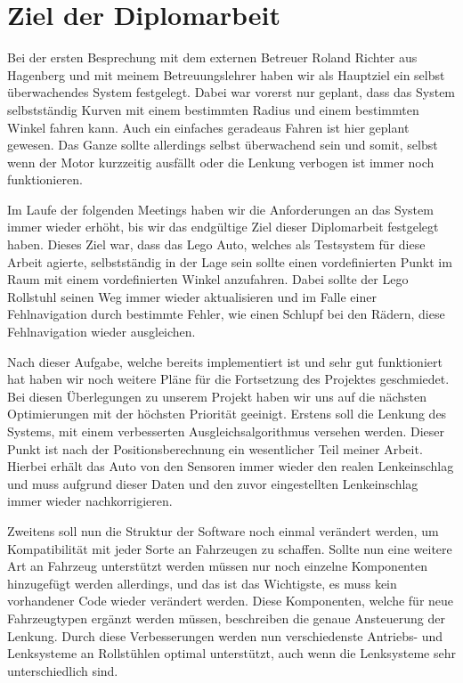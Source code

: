 \section{Ziel der Diplomarbeit}
Bei der ersten Besprechung mit dem externen Betreuer Roland Richter aus Hagenberg und mit meinem Betreuungslehrer haben wir als Hauptziel ein selbst überwachendes System festgelegt.
Dabei war vorerst nur geplant, dass das System selbstständig Kurven mit einem bestimmten Radius und einem bestimmten Winkel fahren kann.
Auch ein einfaches geradeaus Fahren ist hier geplant gewesen.
Das Ganze sollte allerdings selbst überwachend sein und somit, selbst wenn der Motor kurzzeitig ausfällt oder die Lenkung verbogen ist immer noch funktionieren.

Im Laufe der folgenden Meetings haben wir die Anforderungen an das System immer wieder erhöht, bis wir das endgültige Ziel dieser Diplomarbeit festgelegt haben.
Dieses Ziel war, dass das Lego Auto, welches als Testsystem für diese Arbeit agierte, selbstständig in der Lage sein sollte einen vordefinierten Punkt im Raum mit einem vordefinierten Winkel anzufahren.
Dabei sollte der Lego Rollstuhl seinen Weg immer wieder aktualisieren und im Falle einer Fehlnavigation durch bestimmte Fehler, wie einen Schlupf bei den Rädern, diese Fehlnavigation wieder ausgleichen.

Nach dieser Aufgabe, welche bereits implementiert ist und sehr gut funktioniert hat haben wir noch weitere Pläne für die Fortsetzung des Projektes geschmiedet.
Bei diesen Überlegungen zu unserem Projekt haben wir uns auf die nächsten Optimierungen mit der höchsten Priorität geeinigt.
Erstens soll die Lenkung des Systems, mit einem verbesserten Ausgleichsalgorithmus versehen werden.
Dieser Punkt ist nach der Positionsberechnung ein wesentlicher Teil meiner Arbeit.
Hierbei erhält das Auto von den Sensoren immer wieder den realen Lenkeinschlag und muss aufgrund dieser Daten und den zuvor eingestellten Lenkeinschlag immer wieder nachkorrigieren.

Zweitens soll nun die Struktur der Software noch einmal verändert werden, um Kompatibilität mit jeder Sorte an Fahrzeugen zu schaffen.
Sollte nun eine weitere Art an Fahrzeug unterstützt werden müssen nur noch einzelne Komponenten hinzugefügt werden allerdings, und das ist das Wichtigste, es muss kein vorhandener Code wieder verändert werden.
Diese Komponenten, welche für neue Fahrzeugtypen ergänzt werden müssen, beschreiben die genaue Ansteuerung der Lenkung.
Durch diese Verbesserungen werden nun verschiedenste Antriebs- und Lenksysteme an Rollstühlen optimal unterstützt, auch wenn die Lenksysteme sehr unterschiedlich sind.


